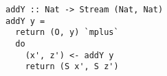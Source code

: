 \begin{figure}[!b]
  \centering
  \begin{minipage}{\columnwidth}
    \begin{lstlisting}[label={add_y}, caption={Function for \lstinline{addo out in out} direction}, captionpos=b, frame=tb]
addY :: Nat -> Stream (Nat, Nat)
addY y =
  return (O, y) `mplus`
  do
    (x', z') <- addY y
    return (S x', S z')
    \end{lstlisting}
  \end{minipage}
\end{figure}
